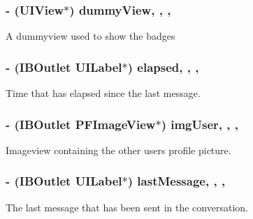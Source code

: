 \subsubsection[{dummy\+View}]{\setlength{\rightskip}{0pt plus 5cm}-\/ (U\+I\+View$\ast$) dummy\+View\hspace{0.3cm}{\ttfamily [read]}, {\ttfamily [write]}, {\ttfamily [nonatomic]}, {\ttfamily [strong]}}\label{interface_e_s_message_cell_a28056ba2c5cbb8ff51a5057ae3f5f437}
A dummyview used to show the badges \hypertarget{interface_e_s_message_cell_a0781f85c3374b88f87c1e5f4a3dd967e}{}
\subsubsection[{elapsed}]{\setlength{\rightskip}{0pt plus 5cm}-\/ (I\+B\+Outlet U\+I\+Label$\ast$) elapsed\hspace{0.3cm}{\ttfamily [read]}, {\ttfamily [write]}, {\ttfamily [nonatomic]}, {\ttfamily [strong]}}\label{interface_e_s_message_cell_a0781f85c3374b88f87c1e5f4a3dd967e}
Time that has elapsed since the last message. \hypertarget{interface_e_s_message_cell_a53a672500c98ad2da7c8e28f8b3ba504}{}
\subsubsection[{img\+User}]{\setlength{\rightskip}{0pt plus 5cm}-\/ (I\+B\+Outlet P\+F\+Image\+View$\ast$) img\+User\hspace{0.3cm}{\ttfamily [read]}, {\ttfamily [write]}, {\ttfamily [nonatomic]}, {\ttfamily [strong]}}\label{interface_e_s_message_cell_a53a672500c98ad2da7c8e28f8b3ba504}
Imageview containing the other user\textquotesingle{}s profile picture. \hypertarget{interface_e_s_message_cell_a9b4d3872ccdf1b7a26d788e967f0f49c}{}
\subsubsection[{last\+Message}]{\setlength{\rightskip}{0pt plus 5cm}-\/ (I\+B\+Outlet U\+I\+Label$\ast$) last\+Message\hspace{0.3cm}{\ttfamily [read]}, {\ttfamily [write]}, {\ttfamily [nonatomic]}, {\ttfamily [strong]}}\label{interface_e_s_message_cell_a9b4d3872ccdf1b7a26d788e967f0f49c}
The last message that has been sent in the conversation. \hypertarget{interface_e_s_message_cell_aa596cb979f7178f1e259aff80297423b}{}
